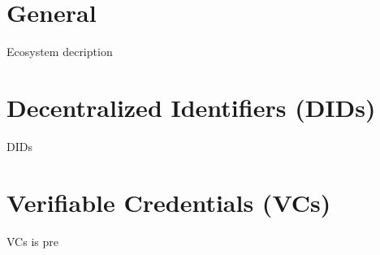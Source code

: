 \section{General}
Ecosystem decription
\section{Decentralized Identifiers (DIDs)}
DIDs
\section{Verifiable Credentials (VCs)}
VCs is pre